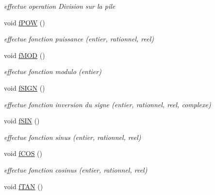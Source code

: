 \begin{DoxyCompactItemize}
\begin{DoxyCompactList}\small\item\em effectue operation Division sur la pile \end{DoxyCompactList}\item 
\hypertarget{class_pile_a1ea4c2ae05a4fc10dea3741e5ad98eca}{void \hyperlink{class_pile_a1ea4c2ae05a4fc10dea3741e5ad98eca}{f\-P\-O\-W} ()}\label{class_pile_a1ea4c2ae05a4fc10dea3741e5ad98eca}

\begin{DoxyCompactList}\small\item\em effectue fonction puissance (entier, rationnel, reel) \end{DoxyCompactList}\item 
\hypertarget{class_pile_a2730fae99b4c5179b79cd9f124429ad9}{void \hyperlink{class_pile_a2730fae99b4c5179b79cd9f124429ad9}{f\-M\-O\-D} ()}\label{class_pile_a2730fae99b4c5179b79cd9f124429ad9}

\begin{DoxyCompactList}\small\item\em effectue fonction modulo (entier) \end{DoxyCompactList}\item 
\hypertarget{class_pile_a2c8f3f9e11497dad8fdd1d426abe2bb8}{void \hyperlink{class_pile_a2c8f3f9e11497dad8fdd1d426abe2bb8}{f\-S\-I\-G\-N} ()}\label{class_pile_a2c8f3f9e11497dad8fdd1d426abe2bb8}

\begin{DoxyCompactList}\small\item\em effectue fonction inversion du signe (entier, rationnel, reel, complexe) \end{DoxyCompactList}\item 
\hypertarget{class_pile_a7c57a5b96416585b364551183fac9d5b}{void \hyperlink{class_pile_a7c57a5b96416585b364551183fac9d5b}{f\-S\-I\-N} ()}\label{class_pile_a7c57a5b96416585b364551183fac9d5b}

\begin{DoxyCompactList}\small\item\em effectue fonction sinus (entier, rationnel, reel) \end{DoxyCompactList}\item 
\hypertarget{class_pile_aabc4b3288a748cc5fc20e3eafe03e418}{void \hyperlink{class_pile_aabc4b3288a748cc5fc20e3eafe03e418}{f\-C\-O\-S} ()}\label{class_pile_aabc4b3288a748cc5fc20e3eafe03e418}

\begin{DoxyCompactList}\small\item\em effectue fonction cosinus (entier, rationnel, reel) \end{DoxyCompactList}\item 
\hypertarget{class_pile_a8a3fadda0bf8ca55861fc17d15573b18}{void \hyperlink{class_pile_a8a3fadda0bf8ca55861fc17d15573b18}{f\-T\-A\-N} ()}\label{class_pile_a8a3fadda0bf8ca55861fc17d15573b18}


\end{DoxyCompactItemize}
